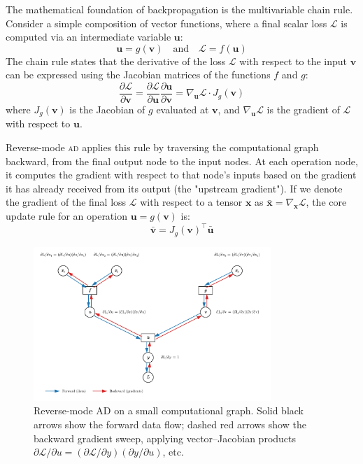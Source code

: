 \documentclass[a4paper]{article}
\newcommand{\acronym}[1]{\textsc{#1}}
\begin{document}
The mathematical foundation of backpropagation is the multivariable chain rule. Consider a simple composition of vector functions, where a final scalar loss $\mathcal{L}$ is computed via an intermediate variable $\mathbf{u}$:
\begin{equation}
    \mathbf{u} = g(\mathbf{v}) \quad \text{and} \quad \mathcal{L} = f(\mathbf{u})
\end{equation}
The chain rule states that the derivative of the loss $\mathcal{L}$ with respect to the input $\mathbf{v}$ can be expressed using the Jacobian matrices of the functions $f$ and $g$:
\begin{equation}
    \frac{\partial \mathcal{L}}{\partial \mathbf{v}} = \frac{\partial \mathcal{L}}{\partial \mathbf{u}} \frac{\partial \mathbf{u}}{\partial \mathbf{v}} = \nabla_{\mathbf{u}} \mathcal{L} \cdot J_g(\mathbf{v})
\end{equation}
where $J_g(\mathbf{v})$ is the Jacobian of $g$ evaluated at $\mathbf{v}$, and $\nabla_{\mathbf{u}} \mathcal{L}$ is the gradient of $\mathcal{L}$ with respect to $\mathbf{u}$.

Reverse-mode \acronym{ad} applies this rule by traversing the computational graph backward, from the final output node to the input nodes. At each operation node, it computes the gradient with respect to that node's inputs based on the gradient it has already received from its output (the "upstream gradient"). If we denote the gradient of the final loss $\mathcal{L}$ with respect to a tensor $\mathbf{x}$ as $\bar{\mathbf{x}} = \nabla_{\mathbf{x}} \mathcal{L}$, the core update rule for an operation $\mathbf{u} = g(\mathbf{v})$ is:
\begin{equation}
    \bar{\mathbf{v}} = J_g(\mathbf{v})^{\top} \bar{\mathbf{u}}
\end{equation}

\begin{figure}[t]
  \centering
  \includegraphics[width=0.8\textwidth]{rev_ad_diagram}
  \caption{Reverse-mode AD on a small computational graph. Solid black arrows
  show the forward data flow; dashed red arrows show the backward gradient
  sweep, applying vector–Jacobian products \( \partial \mathcal{L}/\partial u
  = (\partial \mathcal{L}/\partial y)(\partial y/\partial u) \), etc.}
  \label{fig:rev_ad_mechanics}
\end{figure}
\end{document}
